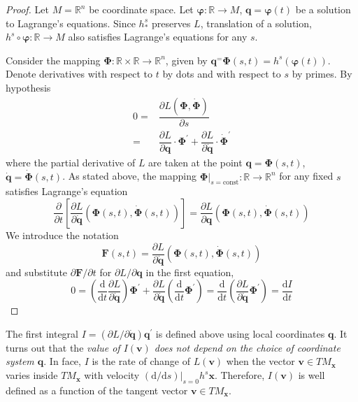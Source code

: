 \documentclass[conference]{IEEEtran}
\theoremstyle{definition}
\theoremstyle{remark}
\begin{document}
    \begin{proof}
        Let $M = \mathbb{R}^n$ be coordinate space. Let $\bm{\varphi}: \mathbb{R} \to M$, $\mathbf{q} = \bm{\varphi}(t)$ be a solution to Lagrange's equations. Since $h^s_{*}$ preserves $L$, translation of a solution, $h^s \circ \bm{\varphi}: \mathbb{R} \to M$ also satisfies Lagrange's equations for any $s$.

        Consider the mapping $\bm{\Phi}: \mathbb{R} \times \mathbb{R} \to \mathbb{R}^n$, given by $\mathbf{q}^ = \bm{\Phi}(s, t) = h^s(\bm{\varphi}(t))$. Denote derivatives with respect to $t$ by dots and with respect to $s$ by primes. By hypothesis
        \begin{align*}
            0 =& \dfrac{\partial L(\bm{\Phi}, \dot{\bm{\Phi}})}{\partial s} \\
            =& \dfrac{\partial L}{\partial \mathbf{q}} \cdot \bm{\Phi}^\prime + \dfrac{\partial L}{\partial \dot{\mathbf{q}}} \cdot \dot{\bm{\Phi}}^\prime
        \end{align*}
        where the partial derivative of $L$ are taken at the point $\mathbf{q} = \bm{\Phi}(s, t)$, $\dot{\mathbf{q}} = \dot{\bm{\Phi}}(s, t)$. As stated above, the mapping $\left. \bm{\Phi} \right|_{s = \text{const}}: \mathbb{R} \to \mathbb{R}^n$ for any fixed $s$ satisfies Lagrange's equation
        \begin{equation*}
            \dfrac{\partial}{\partial t} \left[ \dfrac{\partial L}{\partial \dot{\mathbf{q}}} \left( \bm{\Phi}(s, t), \dot{\bm{\Phi}}(s, t) \right) \right] = \dfrac{\partial L}{\partial \mathbf{q}} \left( \bm{\Phi}(s, t), \dot{\bm{\Phi}}(s, t) \right)
        \end{equation*}
        We introduce the notation
        \begin{equation*}
            \mathbf{F}(s, t) = \dfrac{\partial L}{\partial \dot{\mathbf{q}}} \left( \bm{\Phi}(s, t), \dot{\bm{\Phi}}(s, t) \right)
        \end{equation*}
        and substitute $\partial \mathbf{F} / \partial t$ for $\partial L / \partial \mathbf{q}$ in the first equation,
        \begin{equation*}
            0 = \left( \dfrac{\mathrm{d}}{\mathrm{d} t} \dfrac{\partial L}{\partial \dot{\mathbf{q}}} \right) \bm{\Phi}^\prime + \dfrac{\partial L}{\partial \dot{\mathbf{q}}} \left( \dfrac{\mathrm{d}}{\mathrm{d} t} \bm{\Phi}^\prime \right) = \dfrac{\mathrm{d}}{\mathrm{d} t} \left( \dfrac{\partial L}{\partial \dot{\mathbf{q}}} \bm{\Phi}^\prime \right) = \dfrac{\mathrm{d} I}{\mathrm{d} t}
        \end{equation*}
    \end{proof}
    The first integral $I = (\partial L / \partial \dot{\mathbf{q}}) \mathbf{q}^\prime$ is defined above using local coordinates $\mathbf{q}$. It turns out that the \emph{value of $I(\mathbf{v})$ does not depend on the choice of coordinate system $\mathbf{q}$}. In face, $I$ is the rate of change of $L(\mathbf{v})$ when the vector $\mathbf{v} \in TM_{\mathbf{x}}$ varies inside $TM_{\mathbf{x}}$ with velocity $(\mathrm{d} / \mathrm{d} s)|_{s = 0} h^s \mathbf{x}$. Therefore, $I(\mathbf{v})$ is well defined as a function of the tangent vector $\mathbf{v} \in TM_{\mathbf{x}}$.
\end{document}
